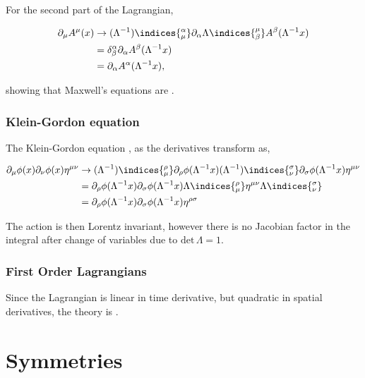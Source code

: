 For the second part of the Lagrangian,
\begin{derivation}
  \begin{equation}
    \begin{aligned}
      \partial_\mu A^\mu(x) &\rightarrow (\Lambda^{-1})\indices{^\alpha_\mu}\partial_\alpha \Lambda\indices{^\mu_\beta}A^\beta(\Lambda^{-1}x)\\
                           &= \delta^\alpha_\beta\partial_\alpha A^\beta(\Lambda^{-1}x)\\
                           &= \partial_\alpha A^\alpha(\Lambda^{-1}x),
    \end{aligned}
  \end{equation}
\end{derivation}
showing that Maxwell's equations are .

\subsubsection{Klein-Gordon equation}
The Klein-Gordon equation , as the derivatives transform as,
\begin{derivation}
  \begin{equation}
    \begin{aligned}
      \partial_\mu \phi(x)\partial_\nu\phi(x)\eta^{\mu\nu} &\rightarrow (\Lambda^{-1})\indices{^\rho_\mu}\partial_\rho \phi(\Lambda^{-1}x)(\Lambda^{-1})\indices{^\sigma_\nu}\partial_\sigma\phi(\Lambda^{-1}x)\eta^{\mu\nu}\\
                                                           &= \partial_\rho \phi(\Lambda^{-1}x)\partial_\sigma\phi(\Lambda^{-1}x)\Lambda\indices{^\rho_\mu}\eta^{\mu\nu}\Lambda\indices{^\sigma_\nu}\\
                                                           &= \partial_\rho \phi(\Lambda^{-1}x)\partial_\sigma\phi(\Lambda^{-1}x)\eta^{\rho\sigma}
    \end{aligned}
  \end{equation}
\end{derivation}


The action is then Lorentz invariant, however there is no Jacobian factor in the integral after change of variables due to $\text{det}\,\Lambda=1$.
\subsubsection{First Order Lagrangians}
Since the Lagrangian is linear in time derivative, but quadratic in spatial derivatives, the theory is .

\section{Symmetries}

